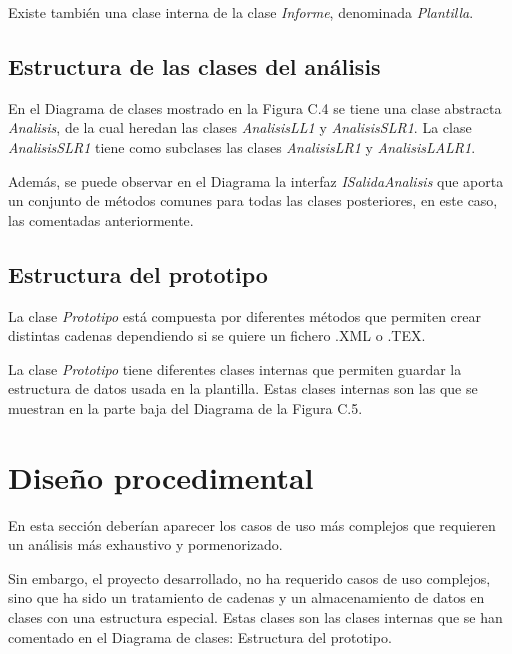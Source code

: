 Existe también una clase interna de la clase \textit{Informe}, denominada \textit{Plantilla}.


\subsection{Estructura de las clases del análisis}

En el Diagrama de clases mostrado en la Figura C.4 se tiene una clase abstracta \textit{Analisis}, de la cual heredan las clases \textit{AnalisisLL1} y \textit{AnalisisSLR1}. La clase \textit{AnalisisSLR1} tiene como subclases las clases \textit{AnalisisLR1} y \textit{AnalisisLALR1}.

Además, se puede observar en el Diagrama la interfaz \textit{ISalidaAnalisis} que aporta un conjunto de métodos comunes para todas las clases posteriores, en este caso, las comentadas anteriormente.


\subsection{Estructura del prototipo}

La clase \textit{Prototipo} está compuesta por diferentes métodos que permiten crear distintas cadenas dependiendo si se quiere un fichero .XML o .TEX.

La clase \textit{Prototipo} tiene diferentes clases internas que permiten guardar la estructura de datos usada en la plantilla. Estas clases internas son las que se muestran en la parte baja del Diagrama de la Figura C.5.


\section{Diseño procedimental}

En esta sección deberían aparecer los casos de uso más complejos que requieren un análisis más exhaustivo y pormenorizado.

Sin embargo, el proyecto desarrollado, no ha requerido casos de uso complejos, sino que ha sido un tratamiento de cadenas y un almacenamiento de datos en clases con una estructura especial. Estas clases son las clases internas que se han comentado en el Diagrama de clases: Estructura del prototipo.

